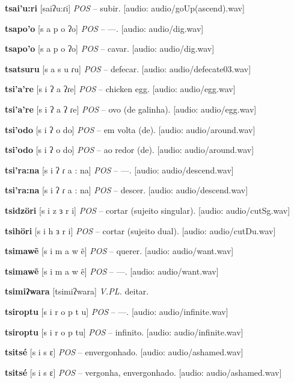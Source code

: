 \textbf{tsai'u:ri} [saiʔu:ɾi] \textit{POS} -- subir. [audio: audio/goUp(ascend).wav]{\faHeadphones}

\textbf{tsapo'o} [s a p o ʔo] \textit{POS} -- —. [audio: audio/dig.wav]{\faHeadphones}

\textbf{tsapo'o} [s a p o ʔo] \textit{POS} -- cavar. [audio: audio/dig.wav]{\faHeadphones}

\textbf{tsatsuru} [s a s u ɾu] \textit{POS} -- defecar. [audio: audio/defecate03.wav]{\faHeadphones}

\textbf{tsi'a're} [s i ʔ a ʔɾe] \textit{POS} -- chicken egg. [audio: audio/egg.wav]{\faHeadphones}

\textbf{tsi'a're} [s i ʔ a ʔ ɾe] \textit{POS} -- ovo (de galinha). [audio: audio/egg.wav]{\faHeadphones}

\textbf{tsi'odo} [s i ʔ o do] \textit{POS} -- em volta (de). [audio: audio/around.wav]{\faHeadphones}

\textbf{tsi'odo} [s i ʔ o do] \textit{POS} -- ao redor (de). [audio: audio/around.wav]{\faHeadphones}

\textbf{tsi'ra:na} [s i ʔ ɾ a : na] \textit{POS} -- —. [audio: audio/descend.wav]{\faHeadphones}

\textbf{tsi'ra:na} [s i ʔ ɾ a : na] \textit{POS} -- descer. [audio: audio/descend.wav]{\faHeadphones}

\textbf{tsidzöri} [s i z ɜ r i] \textit{POS} -- cortar (sujeito singular). [audio: audio/cutSg.wav]{\faHeadphones}

\textbf{tsihöri} [s i h ɜ r i] \textit{POS} -- cortar (sujeito dual). [audio: audio/cutDu.wav]{\faHeadphones}

\textbf{tsimawẽ} [s i m a w ẽ] \textit{POS} -- querer. [audio: audio/want.wav]{\faHeadphones}

\textbf{tsimawẽ} [s i m a w ẽ] \textit{POS} -- —. [audio: audio/want.wav]{\faHeadphones}

\textbf{tsimiʔwara} [tsimiʔwara] \textit{V.PL.} deitar.

\textbf{tsiroptu} [s i r o p t u] \textit{POS} -- —. [audio: audio/infinite.wav]{\faHeadphones}

\textbf{tsiroptu} [s i r o p tu] \textit{POS} -- infinito. [audio: audio/infinite.wav]{\faHeadphones}

\textbf{tsitsé} [s i s ɛ] \textit{POS} -- envergonhado. [audio: audio/ashamed.wav]{\faHeadphones}

\textbf{tsitsé} [s i s ɛ] \textit{POS} -- vergonha, envergonhado. [audio: audio/ashamed.wav]{\faHeadphones}


